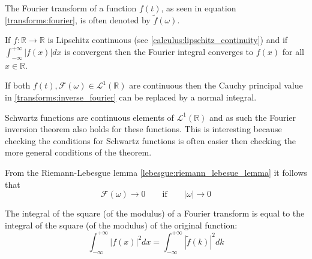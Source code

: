 	\begin{notation}
		The Fourier transform of a function $f(t)$, as seen in equation \ref{transforms:fourier}, is often denoted by $\widetilde{f}(\omega)$.
	\end{notation}
    
	\begin{theorem}
	    	If $f:\mathbb{R}\rightarrow\mathbb{R}$ is Lipschitz continuous (see \ref{calculus:lipschitz_continuity}) and if $\int_{-\infty}^{+\infty}|f(x)|dx$ is convergent then the Fourier integral converges to $f(x)$ for all $x\in\mathbb{R}$.
	\end{theorem}
	\begin{theorem}
	    	If both $f(t), \mathcal{F}(\omega)\in\mathcal{L}^1(\mathbb{R})$ are continuous then the Cauchy principal value in \ref{transforms:inverse_fourier} can be replaced by a normal integral.
	\end{theorem}
	\begin{remark}
    		Schwartz functions are continuous elements of $\mathcal{L}^1(\mathbb{R})$ and as such the Fourier inversion theorem also holds for these functions. This is interesting because checking the conditions for Schwartz functions is often easier then checking the more general conditions of the theorem.
	\end{remark}
    
	\begin{property}
	    	From the Riemann-Lebesgue lemma \ref{lebesgue:riemann_lebesue_lemma} it follows that
	        \begin{equation}
	        	\mathcal{F}(\omega)\rightarrow0 \qquad\text{if}\qquad |\omega|\rightarrow0
	        \end{equation}
	\end{property}
    
	\begin{result}
    		The integral of the square (of the modulus) of a Fourier transform is equal to the integral of the square (of the modulus) of the original function:
    		\begin{equation}
    			\label{transforms:plancherel_theorem}
        		\int_{-\infty}^{+\infty}|f(x)|^2dx = \int_{-\infty}^{+\infty}|\widetilde{f}(k)|^2dk
	   	\end{equation}
	\end{result}
	
